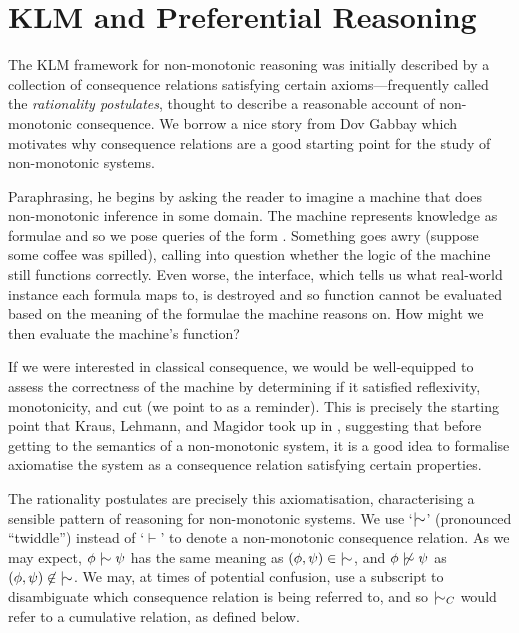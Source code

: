 \section{KLM and Preferential Reasoning}
The KLM framework for non-monotonic reasoning was initially described by a collection of consequence relations satisfying
certain axioms---frequently called the \textit{rationality postulates}, thought to describe a reasonable account of non-monotonic
consequence. We borrow a nice story from Dov Gabbay \cite{gabbay1985theoreticalFoundations} which motivates why
consequence relations are a good starting point for the study of non-monotonic systems.

Paraphrasing, he begins by asking the reader to imagine a machine that does non-monotonic inference in some domain. The
machine represents knowledge as formulae and so we pose queries of the form .
Something goes awry (suppose some coffee was spilled), calling into question whether the logic of the machine still functions
correctly. Even worse, the interface, which tells us what real-world instance each formula maps to, is destroyed and so function
cannot be evaluated based on the meaning of the formulae the machine reasons on. How might we then evaluate the machine's
function?

If we were interested in classical consequence, we would be well-equipped to assess the correctness of the machine by determining
if it satisfied reflexivity, monotonicity, and cut (we point to  as a reminder).
This is precisely the starting point that Kraus, Lehmann, and Magidor took up in \cite{kraus1990nonmonotonic}, suggesting
that before getting to the semantics of a non-monotonic system, it is a good idea to formalise axiomatise the system as
a consequence relation satisfying certain properties.

The rationality postulates are precisely this axiomatisation, characterising a sensible pattern of reasoning for non-monotonic
systems. We use `$\twiddle$' (pronounced ``twiddle'') instead of `$\vdash$' to denote a non-monotonic consequence
relation. As we may expect, $\phi \twiddle \psi$ has the same meaning as $(\phi, \psi) \in \; \twiddle$, and $\phi \ntwiddle
\psi$ as $(\phi, \psi)\not \in \; \twiddle$. We may, at times of potential confusion, use a subscript to disambiguate
which consequence relation is being referred to, and so $\twiddle_{C}$ would refer to a cumulative relation, as defined
below.

